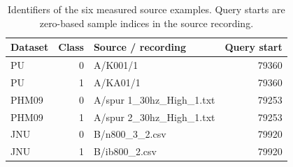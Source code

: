 \begin{table}[pos=htbp]
\centering\footnotesize
\caption{Identifiers of the six measured source examples. Query starts are zero-based sample indices in the source recording.}
\label{tab:source-identifiers}
\begin{tabular}{lrlr}
\toprule
Dataset & Class & Source / recording & Query start\\
\midrule
PU & 0 & A/K001/1 & 79360\\
PU & 1 & A/KA01/1 & 79360\\
PHM09 & 0 & A/spur 1\_30hz\_High\_1.txt & 79253\\
PHM09 & 1 & A/spur 2\_30hz\_High\_1.txt & 79253\\
JNU & 0 & B/n800\_3\_2.csv & 79920\\
JNU & 1 & B/ib800\_2.csv & 79920\\
\bottomrule
\end{tabular}
\end{table}
